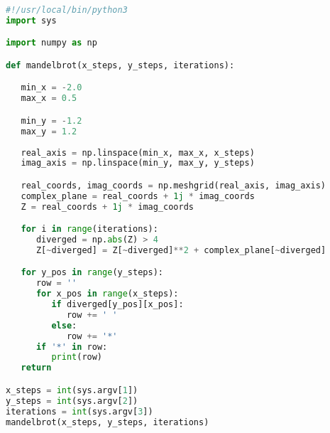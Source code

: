 \documentclass[10pt, twoside,a4paper]{article}
\begin{document}
\begin{lstlisting}[language=python]
#!/usr/local/bin/python3
import sys

import numpy as np

def mandelbrot(x_steps, y_steps, iterations):

   min_x = -2.0
   max_x = 0.5

   min_y = -1.2
   max_y = 1.2
   
   real_axis = np.linspace(min_x, max_x, x_steps)
   imag_axis = np.linspace(min_y, max_y, y_steps)

   real_coords, imag_coords = np.meshgrid(real_axis, imag_axis)
   complex_plane = real_coords + 1j * imag_coords
   Z = real_coords + 1j * imag_coords

   for i in range(iterations):
      diverged = np.abs(Z) > 4
      Z[~diverged] = Z[~diverged]**2 + complex_plane[~diverged]

   for y_pos in range(y_steps):
      row = ''
      for x_pos in range(x_steps):
         if diverged[y_pos][x_pos]:
            row += ' '
         else:
            row += '*'
      if '*' in row:
         print(row)
   return

x_steps = int(sys.argv[1])
y_steps = int(sys.argv[2])
iterations = int(sys.argv[3])
mandelbrot(x_steps, y_steps, iterations)
\end{lstlisting}

\newpage
\end{document}
